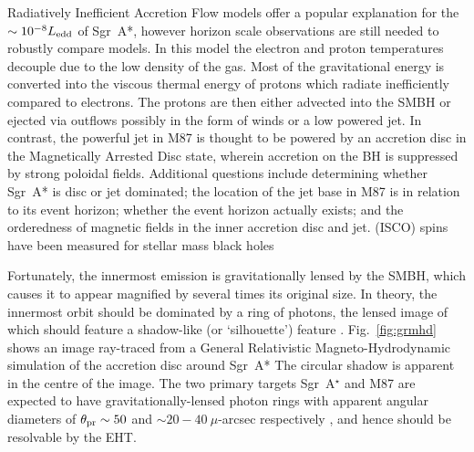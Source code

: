 Radiatively Inefficient Accretion Flow \citep[(RIAF),][]{Narayan_1995,Yuan_2003} models offer a popular explanation for the $\sim 10^{-8} L_{\rm edd}$ of Sgr~A*, however horizon scale observations are still needed to robustly compare models. In this model the electron and proton temperatures decouple due to the low density of the gas. Most of the gravitational energy is converted into the viscous thermal energy of protons which radiate inefficiently compared to electrons. The protons are then either advected into the SMBH or ejected via outflows possibly in the form of winds or a low powered jet. In contrast, the powerful jet in M87 is thought to be powered by an accretion disc in the Magnetically Arrested Disc \citep[(MAD),][]{Narayan_2003} state, wherein accretion on the BH is suppressed by strong poloidal fields. Additional questions include determining whether Sgr~A* is disc or jet dominated; the location of the jet base in M87 is in relation to its event horizon; whether the event horizon actually exists; and the orderedness of magnetic fields in the inner accretion disc and jet.
(ISCO)
spins have been measured for stellar mass black holes

Fortunately, the innermost emission is gravitationally lensed by the SMBH, which causes it to appear magnified by several times its original size. In theory, the innermost orbit should be dominated by a ring of photons, the lensed image of which should feature a shadow-like (or `silhouette') feature \citep[e.g.][]{Johannsen_2010}. Fig.~\ref{fig:grmhd} shows an image ray-traced from a General Relativistic Magneto-Hydrodynamic simulation of the accretion disc around Sgr~A* \citep{Moscibrodzka_2014} The circular shadow is apparent in the centre of the image. The two primary targets Sgr~A$^\star$ and M87 are expected to have gravitationally-lensed photon rings with apparent angular diameters of $\theta_{\rm pr} \sim 50$ and $\sim 20-40\ \mu$-arcsec respectively \citep*{Broderick_2009,Falcke_2013}, and hence should be resolvable by the EHT. 




